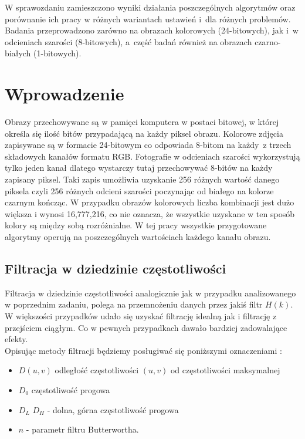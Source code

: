 \documentclass{classrep}
\begin{document}
W sprawozdaniu zamieszczono wyniki działania poszczególnych algorytmów oraz porównanie ich pracy w różnych wariantach ustawień i~dla różnych problemów. Badania przeprowadzono zarówno na obrazach kolorowych (24-bitowych), jak i~w odcieniach szarości (8-bitowych), a~część badań również na obrazach czarno-białych (1-bitowych). 

\section{Wprowadzenie}
Obrazy przechowywane są w pamięci komputera w postaci bitowej, w której określa się ilość bitów przypadającą na każdy piksel obrazu. Kolorowe zdjęcia zapisywane są w formacie 24-bitowym co odpowiada 8-bitom na każdy~z trzech składowych kanałów formatu RGB. Fotografie w odcieniach szarości wykorzystują tylko jeden kanał dlatego wystarczy tutaj przechowywać 8-bitów na każdy zapisany piksel. Taki zapis umożliwia uzyskanie 256 różnych wartość danego piksela czyli 256 różnych odcieni szarości poczynając od białego na kolorze czarnym kończąc. W przypadku obrazów kolorowych liczba kombinacji jest dużo większa i wynosi 16,777,216, co nie oznacza, że wszystkie uzyskane w ten sposób kolory są między sobą rozróżnialne. W tej pracy wszystkie przygotowane algorytmy operują na poszczególnych wartościach każdego kanału obrazu.

\subsection{Filtracja w dziedzinie częstotliwości}

Filtracja w dziedzinie częstotliwości analogicznie jak w przypadku analizowanego w poprzednim zadaniu, polega na przemnożeniu danych przez jakiś filtr $H(k)$.  W większości przypadków udało się uzyskać filtrację idealną jak i filtrację z przejściem ciągłym. Co w pewnych przypadkach dawało bardziej zadowalające efekty.\\ Opisując metody filtracji będziemy posługiwać się poniższymi oznaczeniami :
\begin{itemize}
\item $D(u,v)$ odległość częstotliwości $(u,v)$ od częstotliwości maksymalnej
\item $D_0$ częstotliwość progowa
\item $D_L$ $D_H$ - dolna, górna częstotliwość progowa
\item $n$ - parametr filtru Butterwortha.
\end{itemize}
\end{document}
